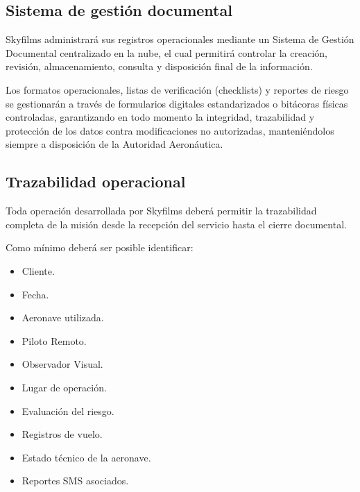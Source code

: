 \subsection{Sistema de gestión documental}
Skyfilms administrará sus registros operacionales mediante un Sistema de Gestión Documental centralizado en la nube, el cual permitirá controlar la creación, revisión, almacenamiento, consulta y disposición final de la información. 

Los formatos operacionales, listas de verificación (checklists) y reportes de riesgo se gestionarán a través de formularios digitales estandarizados o bitácoras físicas controladas, garantizando en todo momento la integridad, trazabilidad y protección de los datos contra modificaciones no autorizadas, manteniéndolos siempre a disposición de la Autoridad Aeronáutica.

\subsection{Trazabilidad operacional}

Toda operación desarrollada por Skyfilms deberá permitir la trazabilidad completa de la misión desde la recepción del servicio hasta el cierre documental.

Como mínimo deberá ser posible identificar:

\begin{itemize}

\item Cliente.

\item Fecha.

\item Aeronave utilizada.

\item Piloto Remoto.

\item Observador Visual.

\item Lugar de operación.

\item Evaluación del riesgo.

\item Registros de vuelo.

\item Estado técnico de la aeronave.

\item Reportes SMS asociados.

\end{itemize}


